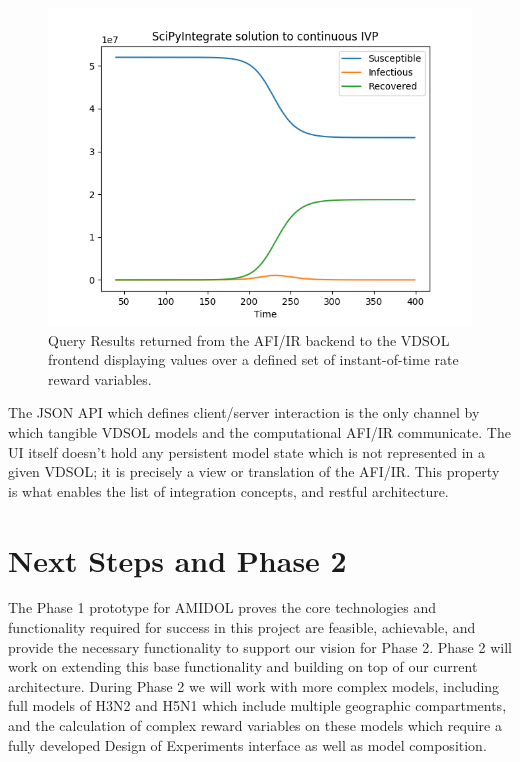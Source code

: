 \documentclass[11pt]{article}
\newcommand{\amidol}{\textsc{AMIDOL}}
\begin{document}
\begin{figure}
\includegraphics[width=\textwidth]{figs/QueryResult.png}
\caption{Query Results returned from the AFI/IR backend to the VDSOL frontend displaying values over a defined set of instant-of-time rate reward variables.}
\label{Fig:QueryResult}
\end{figure}

The JSON API which defines client/server interaction is the only channel by which tangible VDSOL models and the computational AFI/IR communicate. The UI itself doesn't hold any persistent model state which is not represented in a given VDSOL; it is precisely a view or translation of the AFI/IR. This property is what enables the list of integration concepts, and restful architecture.

\section{Next Steps and Phase 2}

The Phase 1 prototype for \amidol{} proves the core technologies and functionality required for success in this project are feasible, achievable, and provide the necessary functionality to support our vision for Phase 2.  Phase 2 will work on extending this base functionality and building on top of our current architecture.  During Phase 2 we will work with more complex models, including full models of H3N2 and H5N1 which include multiple geographic compartments, and the calculation of complex reward variables on these models which require a fully developed Design of Experiments interface as well as model composition.
\end{document}
